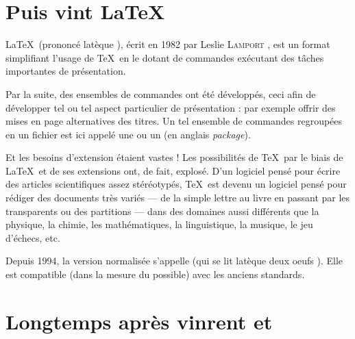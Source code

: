 \section{Puis vint \LaTeX}

\LaTeX\ (prononcé \og latèque \fg{}), écrit en 1982 par Leslie \textsc{Lamport} \cite{lamp}, est un format simplifiant l'usage de \TeX\ en le dotant de commandes exécutant des tâches importantes de présentation. 

Par la suite, des ensembles de commandes ont été développés, ceci afin de développer tel ou tel aspect particulier de présentation : par exemple offrir des mises en page alternatives des titres. Un tel ensemble de commandes regroupées en un fichier est ici appelé une  ou un \og {} \fg{} (en anglais \emph{package}). 

Et les besoins d'extension étaient vastes ! Les possibilités de \TeX\ par le biais de \LaTeX\ et de ses extensions ont, de fait, explosé. D'un logiciel pensé pour écrire des articles scientifiques assez stéréotypés, \TeX\ est devenu un logiciel pensé pour rédiger des documents très variés --- de la simple lettre au livre en passant par les transparents ou des partitions --- dans des domaines aussi différents que la physique, la chimie, les mathématiques, la linguistique, la musique, le jeu d'échecs, etc. 

Depuis 1994, la version normalisée s'appelle \LaTeXe{} (qui se lit \og latèque deux oeufs \fg{}). Elle est compatible (dans la mesure du possible) avec les anciens standards.


\section{Longtemps après vinrent \XeTeXtitre et \XeLaTeXtitre}

